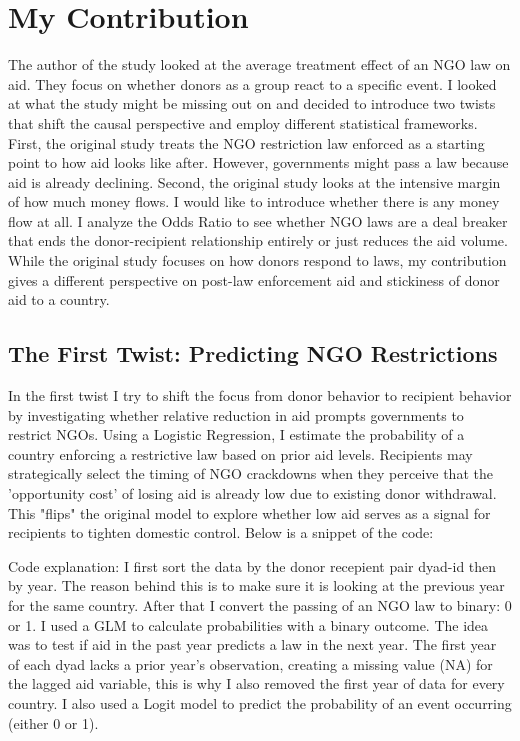 \documentclass[12pt, a4paper]{article}
\begin{document}
\section{My Contribution}

The author of the study looked at the average treatment effect of an NGO law on aid. They focus on whether donors as a group react to a specific event. I looked at what the study might be missing out on and decided to introduce two twists that shift the causal perspective and employ different statistical frameworks.
First, the original study treats the NGO restriction law enforced as a starting point to how aid looks like after. However, governments might pass a law because aid is already declining.
Second, the original study looks at the intensive margin of how much money flows. I would like to introduce whether there is any money flow at all. I analyze the Odds Ratio to see whether NGO laws are a deal breaker that ends the donor-recipient relationship entirely or just reduces the aid volume.
While the original study focuses on how donors respond to laws, my contribution gives a different perspective on post-law enforcement aid and stickiness of donor aid to a country.


\subsection{The First Twist: Predicting NGO Restrictions}
In the first twist I try to shift the focus from donor behavior to recipient behavior by investigating whether relative reduction in aid prompts governments to restrict NGOs. Using a Logistic Regression, I estimate the probability of a country enforcing a restrictive law based on prior aid levels. Recipients may strategically select the timing of NGO crackdowns when they perceive that the 'opportunity cost' of losing aid is already low due to existing donor withdrawal. This "flips" the original model to explore whether low aid serves as a signal for recipients to tighten domestic control. 
\newline Below is a snippet of the code:

Code explanation: I first sort the data by the donor recepient pair dyad-id then by year. The reason behind this is to make sure it is looking at the previous year for the same country. After that I convert the passing of an NGO law to binary: 0 or 1. I used a GLM to calculate probabilities with a binary outcome. The idea was to test if aid in the past year predicts a law in the next year. The first year of each dyad lacks a prior year's observation, creating a missing value (NA) for the lagged aid variable, this is why I also removed the first year of data for every country. I also used a Logit model to predict the probability of an event occurring (either 0 or 1).

\clearpage
\end{document}
